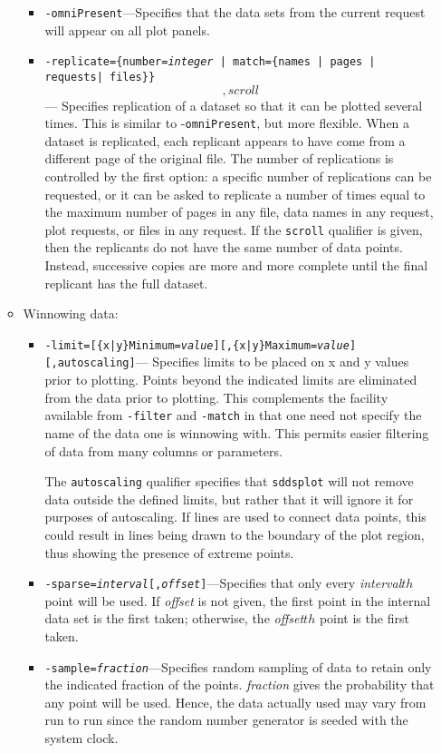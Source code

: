 \begin{itemize}
\begin{itemize}
\begin{itemize}
  \item {\tt -omniPresent}---Specifies that the data sets from the current request will appear on all
plot panels.

  \item {\tt -replicate=\{number={\em integer} | match=\{names | pages | requests| files\}\}\[,scroll\]} --- Specifies replication of a dataset so that it can be plotted several times. This is similar to -{\tt omniPresent}, but more flexible.  When a dataset is replicated,
 each replicant appears to have come from a different page of the original file.  The number of replications is controlled by
 the first option: a specific number of replications can be requested, or it can be asked to replicate a number of times 
 equal to the maximum number of pages in any file, data names in any request, plot requests, or files in any request.  
 If the {\tt scroll} qualifier is given, then the replicants do not have the same number of data points.  Instead, successive
 copies are more and more complete until the final replicant has the full dataset.

  \end{itemize}
\item Winnowing data:
  \begin{itemize}
  \item {\tt -limit=[\{x|y\}Minimum={\em value}][,\{x|y\}Maximum={\em value}][,autoscaling]}---
Specifies limits to be placed on x and y values prior to plotting.  Points beyond the indicated limits are 
eliminated from the data prior to plotting.  This complements the facility available from {\tt -filter} and
{\tt -match} in that one need not specify the name of the data one is winnowing with.  This permits easier
filtering of data from many columns or parameters.

The {\tt autoscaling} qualifier specifies that {\tt sddsplot} will not remove data outside the
defined limits, but rather that it will ignore it for purposes of autoscaling.  If lines are used to
connect data points, this could result in lines being drawn to the boundary of the plot region, thus
showing the presence of extreme points.

  \item {\tt -sparse={\em interval}[,{\em offset}]}---Specifies that only every {\em interval}${
{th}}$ point will be used.  If {\em offset} is not given, the first point in the internal data set is
the first taken; otherwise, the {\em offset}${ {th}}$ point is the first taken.

  \item {\tt -sample={\em fraction}}---Specifies random sampling of data to retain only the indicated
fraction of the points.  {\em fraction} gives the probability that any point will be used.  Hence,
the data actually used may vary from run to run since the random number generator is seeded with the
system clock.


\end{itemize}
\end{itemize}
\end{itemize}
